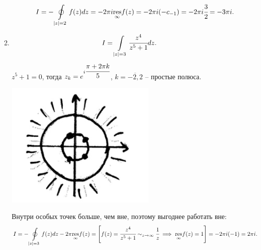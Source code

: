 \documentclass[../../main.tex]{subfiles}
\begin{document}
\begin{examples}
\begin{enumerate}
\begin{enumerate}
	 			
	 			\[I=-\oint\limits_{|z|=2}f(z)dz= -2\pi i \underset{\infty}{\operatorname{res}} f(z) = -2\pi i (-c_{-1}) = -2 \pi i \cfrac{3}{2} = -3\pi i.\]
	 			
 			\end{enumerate}
 		\item \[I=\int\limits_{|z|=3} \cfrac{z^4}{z^5+1}dz.\]
 			$z^5+1=0$, тогда $z_k=e^{i\cfrac{\pi+2\pi k}{5}}$, $k=\overline{-2,2}$ -- простые полюса.
 			
 			\includegraphics{lec35_5}
 			
 			Внутри особых точек больше, чем вне, поэтому выгоднее работать вне:
 			\[
 			I=-\oint\limits_{|z|=3}f(z)dz-2\pi \underset{\infty}{\operatorname{res}}f(z)=\left[ f(z)=\cfrac{z^4}{z^5+1}\sim_{z \rightarrow \infty} \cfrac 1z \implies \underset{\infty}{\operatorname{res}} f(z)=1 \right]=-2\pi i(-1) = 2\pi i.
 			\]	
	 	\end{enumerate}
	 \end{examples}	
\end{document}
